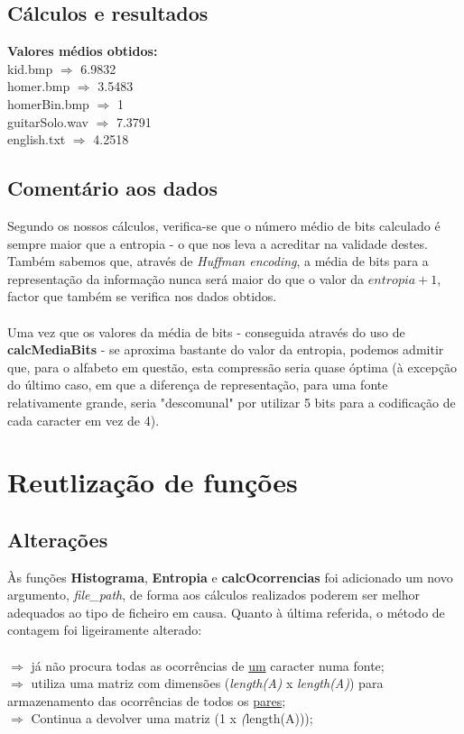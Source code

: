 \documentclass{article}
\begin{document}
\subsection{Cálculos e resultados}

\textbf{Valores médios obtidos:}\\
kid.bmp $\Rightarrow$ 6.9832\\
homer.bmp $\Rightarrow$ 3.5483\\
homerBin.bmp $\Rightarrow$ 1\\
guitarSolo.wav $\Rightarrow$ 7.3791\\
english.txt $\Rightarrow$ 4.2518\\

\subsection{Comentário aos dados}

Segundo os nossos cálculos, verifica-se que o número médio de bits calculado é sempre maior que a entropia - o que nos leva a acreditar na validade destes. Também sabemos que, através de \textit{Huffman encoding}, a média de bits para a representação da informação nunca será maior do que o 
valor da $entropia + 1$, factor que também se verifica nos dados obtidos.\\\\
Uma vez que os valores da média de bits - conseguida através do uso de \textbf{calcMediaBits} - se aproxima bastante do valor da entropia, podemos admitir que, para o alfabeto em questão, esta compressão seria quase óptima (à excepção do último caso, em que a diferença de representação, para uma fonte relativamente grande, seria "descomunal" por utilizar 5 bits para a codificação de cada caracter em vez de 4).

\section{Reutlização de funções}

\subsection{Alterações}

Às funções \textbf{Histograma}, \textbf{Entropia} e \textbf{calcOcorrencias} foi adicionado um novo argumento, \textit{file\_path}, de forma aos cálculos realizados poderem ser melhor adequados ao tipo de ficheiro em causa. Quanto à última referida, o método de contagem foi ligeiramente alterado:\\\\
$\Rightarrow$ já não procura todas as ocorrências de \underline{um} caracter numa fonte;\\
$\Rightarrow$ utiliza uma matriz com dimensões (\textit{length(A)} x \textit{length(A)}) para armazenamento das ocorrências de todos os \underline{pares};\\
$\Rightarrow$ Continua a devolver uma matriz (1 x \textit(length(A)));\\
\end{document}
